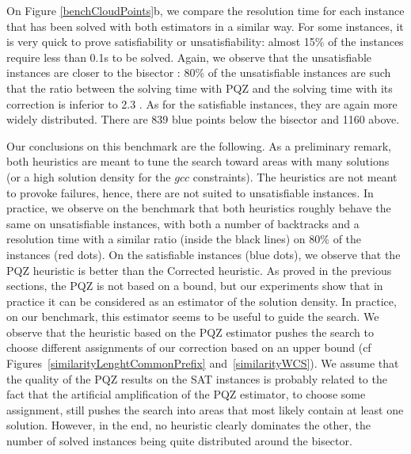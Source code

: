 \documentclass[jair,twoside,11pt,theapa]{article}
\begin{document}
On Figure \ref{benchCloudPoints}b, we compare the resolution time for each instance that has been solved with both estimators in a similar way. For some instances, it is very quick to prove satisfiability or unsatisfiability: almost 15\% of the instances require less than 0.1s to be solved. Again, we  observe that the unsatisfiable instances are closer to the bisector : 80\% of the unsatisfiable instances are such that the ratio between the solving time with PQZ and the solving time with its correction is inferior to 2.3 . As for the satisfiable instances, they are again more widely distributed. There are 839 blue points below the bisector and 1160 above. %

Our conclusions on this benchmark are the following. As a preliminary remark, both heuristics are meant to tune the search toward areas with many solutions (or a high solution density for the $gcc$ constraints). The heuristics are not meant to provoke failures, hence, there are not suited to unsatisfiable instances. In practice, we observe on the benchmark that both heuristics roughly behave the same on unsatisfiable instances, with both a number of backtracks and a resolution time with a similar ratio (inside the black lines) on 80\% of the instances (red dots). On the satisfiable instances (blue dots), we observe that the PQZ heuristic is better than the Corrected heuristic. As proved in the previous sections, the PQZ is not based on a bound, but our experiments show that in practice it can be considered as an estimator of the solution density. In practice, on our benchmark, this estimator seems to be useful to guide the search. 
%
We observe that the heuristic based on the PQZ estimator pushes the search to choose different assignments of our correction based on an upper bound (cf Figures~\ref{similarityLenghtCommonPrefix} and~\ref{similarityWCS}). We assume that the quality of the PQZ results on the SAT instances is probably related to the fact that the artificial amplification of the PQZ estimator, to choose some assignment, still pushes the search into areas that most likely contain at least one solution.
%
However, in the end, no heuristic clearly dominates the other, the number of solved instances being quite distributed around the bisector.

%       
%       
  
\end{document}

